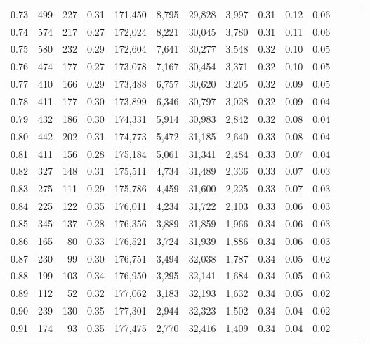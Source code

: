 \begin{tabular}{rrrrrrrrrrrrrr}
0.73 &    499 &  227 &  0.31 &  171,450 &    8,795 &  29,828 &   3,997 &  0.31 &  0.12 &      0.06 \\
0.74 &    574 &  217 &  0.27 &  172,024 &    8,221 &  30,045 &   3,780 &  0.31 &  0.11 &      0.06 \\
0.75 &    580 &  232 &  0.29 &  172,604 &    7,641 &  30,277 &   3,548 &  0.32 &  0.10 &      0.05 \\
0.76 &    474 &  177 &  0.27 &  173,078 &    7,167 &  30,454 &   3,371 &  0.32 &  0.10 &      0.05 \\
0.77 &    410 &  166 &  0.29 &  173,488 &    6,757 &  30,620 &   3,205 &  0.32 &  0.09 &      0.05 \\
0.78 &    411 &  177 &  0.30 &  173,899 &    6,346 &  30,797 &   3,028 &  0.32 &  0.09 &      0.04 \\
0.79 &    432 &  186 &  0.30 &  174,331 &    5,914 &  30,983 &   2,842 &  0.32 &  0.08 &      0.04 \\
0.80 &    442 &  202 &  0.31 &  174,773 &    5,472 &  31,185 &   2,640 &  0.33 &  0.08 &      0.04 \\
0.81 &    411 &  156 &  0.28 &  175,184 &    5,061 &  31,341 &   2,484 &  0.33 &  0.07 &      0.04 \\
0.82 &    327 &  148 &  0.31 &  175,511 &    4,734 &  31,489 &   2,336 &  0.33 &  0.07 &      0.03 \\
0.83 &    275 &  111 &  0.29 &  175,786 &    4,459 &  31,600 &   2,225 &  0.33 &  0.07 &      0.03 \\
0.84 &    225 &  122 &  0.35 &  176,011 &    4,234 &  31,722 &   2,103 &  0.33 &  0.06 &      0.03 \\
0.85 &    345 &  137 &  0.28 &  176,356 &    3,889 &  31,859 &   1,966 &  0.34 &  0.06 &      0.03 \\
0.86 &    165 &   80 &  0.33 &  176,521 &    3,724 &  31,939 &   1,886 &  0.34 &  0.06 &      0.03 \\
0.87 &    230 &   99 &  0.30 &  176,751 &    3,494 &  32,038 &   1,787 &  0.34 &  0.05 &      0.02 \\
0.88 &    199 &  103 &  0.34 &  176,950 &    3,295 &  32,141 &   1,684 &  0.34 &  0.05 &      0.02 \\
0.89 &    112 &   52 &  0.32 &  177,062 &    3,183 &  32,193 &   1,632 &  0.34 &  0.05 &      0.02 \\
0.90 &    239 &  130 &  0.35 &  177,301 &    2,944 &  32,323 &   1,502 &  0.34 &  0.04 &      0.02 \\
0.91 &    174 &   93 &  0.35 &  177,475 &    2,770 &  32,416 &   1,409 &  0.34 &  0.04 &      0.02 \\

\end{tabular}

